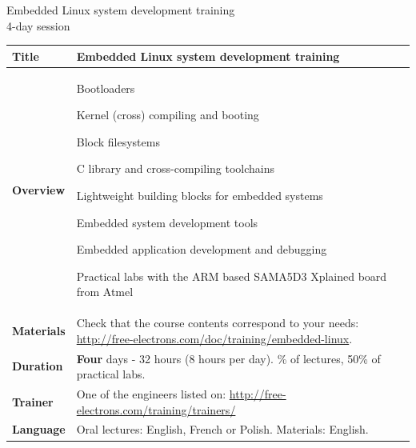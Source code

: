 \documentclass[a4paper,12pt,obeyspaces,spaces,hyphens]{article}
\begin{document}
\thispagestyle{fancy}

\setlength{\arrayrulewidth}{0.8pt}

\begin{center}
\LARGE
Embedded Linux system development training\\
\large
4-day session
\end{center}
\vspace{1cm}

\small
{}

 {
  \begin{tabularx}{\textwidth}{|g|h|}
    {\bf Title} & {\bf Embedded Linux system development training} \\
    \hline

    {\bf Overview} &
	Bootloaders \par
    Kernel (cross) compiling and booting \par
	Block filesystems \par
    C library and cross-compiling toolchains \par
	Lightweight building blocks for embedded systems \par
    Embedded system development tools \par
	Embedded application development and debugging \par
	Practical labs with the ARM based SAMA5D3 Xplained board from Atmel \\
    \hline
    {\bf Materials} &
    Check that the course contents correspond to your needs:
    \newline \url{http://free-electrons.com/doc/training/embedded-linux}. \\
    \hline

    {\bf Duration} & {\bf Four} days - 32 hours (8 hours per day).
    \% of lectures, 50\% of practical labs. \\
    \hline

    {\bf Trainer} & One of the engineers listed on:
    \newline \url{http://free-electrons.com/training/trainers/}\\
    \hline

    {\bf Language} & Oral lectures: English, French or Polish.
    \newline Materials: English.\\
    \hline


\end{tabularx}}
\end{document}
